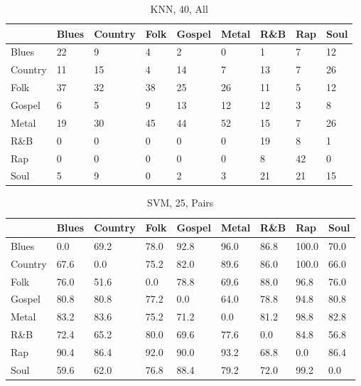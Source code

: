 \documentclass[a4paper,oneside]{article}
\begin{document}
\begin{table}[H]
\caption{KNN, 40, All}
\begin{tabu}{l|*{8}{l}}
 & Blues & Country & Folk & Gospel & Metal & R\&B & Rap & Soul \\ \hline
Blues & 22 & 9 & 4 & 2 & 0 & 1 & 7 & 12 \\
Country & 11 & 15 & 4 & 14 & 7 & 13 & 7 & 26 \\
Folk & 37 & 32 & 38 & 25 & 26 & 11 & 5 & 12 \\
Gospel & 6 & 5 & 9 & 13 & 12 & 12 & 3 & 8 \\
Metal & 19 & 30 & 45 & 44 & 52 & 15 & 7 & 26 \\
R\&B & 0 & 0 & 0 & 0 & 0 & 19 & 8 & 1 \\
Rap & 0 & 0 & 0 & 0 & 0 & 8 & 42 & 0 \\
Soul & 5 & 9 & 0 & 2 & 3 & 21 & 21 & 15 \\
\end{tabu}
\end{table}

\begin{table}[H]
\caption{SVM, 25, Pairs}
\begin{tabu}{l|*{8}{l}}
 & Blues & Country & Folk & Gospel & Metal & R\&B & Rap & Soul \\ \hline
Blues & 0.0 & 69.2 & 78.0 & 92.8 & 96.0 & 86.8 & 100.0 & 70.0 \\
Country & 67.6 & 0.0 & 75.2 & 82.0 & 89.6 & 86.0 & 100.0 & 66.0 \\
Folk & 76.0 & 51.6 & 0.0 & 78.8 & 69.6 & 88.0 & 96.8 & 76.0 \\
Gospel & 80.8 & 80.8 & 77.2 & 0.0 & 64.0 & 78.8 & 94.8 & 80.8 \\
Metal & 83.2 & 83.6 & 75.2 & 71.2 & 0.0 & 81.2 & 98.8 & 82.8 \\
R\&B & 72.4 & 65.2 & 80.0 & 69.6 & 77.6 & 0.0 & 84.8 & 56.8 \\
Rap & 90.4 & 86.4 & 92.0 & 90.0 & 93.2 & 68.8 & 0.0 & 86.4 \\
Soul & 59.6 & 62.0 & 76.8 & 88.4 & 79.2 & 72.0 & 99.2 & 0.0 \\
\end{tabu}
\end{table}
\end{document}

